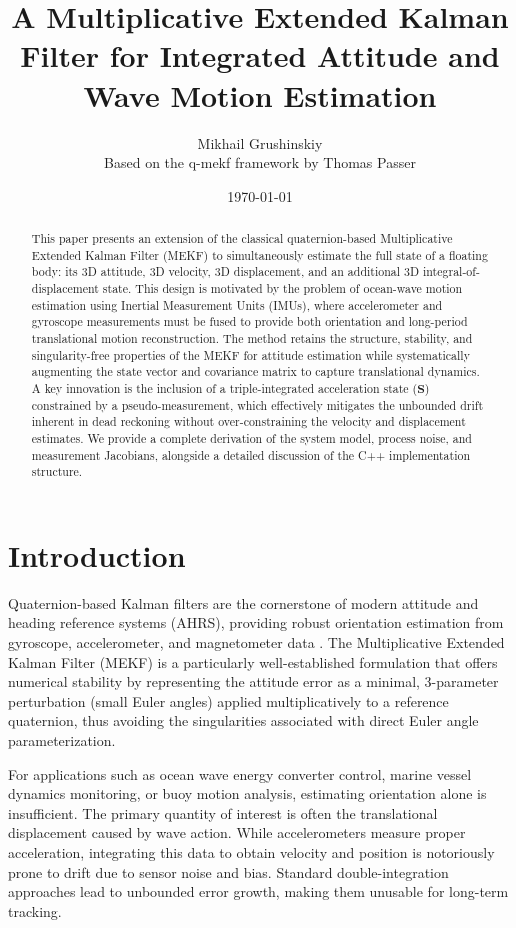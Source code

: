 \documentclass[11pt,letterpaper]{article}
\title{A Multiplicative Extended Kalman Filter for Integrated Attitude and Wave Motion Estimation}
\author{Mikhail Grushinskiy \\ Based on the q-mekf framework by Thomas Passer}
\date{\today}
\begin{document}
\maketitle

\begin{abstract}
This paper presents an extension of the classical quaternion-based Multiplicative Extended Kalman Filter (MEKF) to simultaneously estimate the full state of a floating body: its 3D attitude, 3D velocity, 3D displacement, and an additional 3D integral-of-displacement state. This design is motivated by the problem of ocean-wave motion estimation using Inertial Measurement Units (IMUs), where accelerometer and gyroscope measurements must be fused to provide both orientation and long-period translational motion reconstruction. The method retains the structure, stability, and singularity-free properties of the MEKF for attitude estimation while systematically augmenting the state vector and covariance matrix to capture translational dynamics. A key innovation is the inclusion of a triple-integrated acceleration state ($\bm{S}$) constrained by a pseudo-measurement, which effectively mitigates the unbounded drift inherent in dead reckoning without over-constraining the velocity and displacement estimates. We provide a complete derivation of the system model, process noise, and measurement Jacobians, alongside a detailed discussion of the C++ implementation structure.
\end{abstract}

\section{Introduction}
\label{sec:introduction}
Quaternion-based Kalman filters are the cornerstone of modern attitude and heading reference systems (AHRS), providing robust orientation estimation from gyroscope, accelerometer, and magnetometer data \cite{crassidis2007survey, markley2003attitude}. The Multiplicative Extended Kalman Filter (MEKF) is a particularly well-established formulation that offers numerical stability by representing the attitude error as a minimal, 3-parameter perturbation (small Euler angles) applied multiplicatively to a reference quaternion, thus avoiding the singularities associated with direct Euler angle parameterization.

For applications such as ocean wave energy converter control, marine vessel dynamics monitoring, or buoy motion analysis, estimating orientation alone is insufficient. The primary quantity of interest is often the translational displacement caused by wave action. While accelerometers measure proper acceleration, integrating this data to obtain velocity and position is notoriously prone to drift due to sensor noise and bias. Standard double-integration approaches lead to unbounded error growth, making them unusable for long-term tracking.
\end{document}
